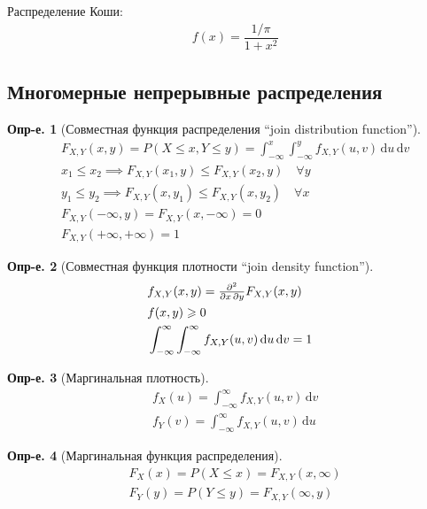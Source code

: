 \documentclass[a4paper,12pt,fleqn]{article}
\numberwithin{figure}{section}
\theoremstyle{definition}
\newtheorem{definition}{Опр-е.}[section]
\let\leqs\leqslant
\let\geqs\geqslant
\def\d{\mathrm{d}}
\begin{document}
Распределение Коши:
\begin{align*}
&	f(x)=\dfrac{1/\pi}{1+x^2}
\end{align*}


\subsection{Многомерные непрерывные распределения}


\begin{definition}[Совместная функция распределения ``join distribution function'']
\begin{align*}
&	F_{X,Y}(x,y) = P(X\leqs x, Y\leqs y)
	= \int_{-\infty}^x \int_{-\infty}^y f_{X,Y}(u,v) \, \d u \, \d v	\\
&	x_1 \leqs x_2 \implies F_{X,Y}(x_1,y) \leqs F_{X,Y}(x_2,y)	\quad \forall y	\\
&	y_1 \leqs y_2 \implies F_{X,Y}(x,y_1) \leqs F_{X,Y}(x,y_2)	\quad \forall x	\\
&	F_{X,Y}(-\infty,y) = F_{X,Y}(x,-\infty) = 0	\\
&	F_{X,Y}(+\infty,+\infty) = 1
\end{align*}
\end{definition}

\begin{definition}[Совместная функция плотности ``join density function'']
\begin{align*}
&	f_{X,Y}(x,y) = \mathsmaller{\frac{\partial^2}{\partial x\,\partial y}} F_{X,Y}(x,y)	\\
&	f(x,y) \geqs 0		\\
&	\int_{-\infty}^{\infty} \int_{-\infty}^{\infty} f_{X,Y}(u,v) \, \d u \, \d v = 1
\end{align*}
\end{definition}

\begin{definition}[Маргинальная плотность]
\begin{align*}
&	f_X(u) = \int_{-\infty}^{\infty} f_{X,Y}(u,v) \, \d v	\\
&	f_Y(v) = \int_{-\infty}^{\infty} f_{X,Y}(u,v) \, \d u
\end{align*}
\end{definition}

\begin{definition}[Маргинальная функция распределения]
\begin{align*}
&	F_X(x) = P(X \leqs x) = F_{X,Y}(x,\infty)	\\
&	F_Y(y) = P(Y \leqs y) = F_{X,Y}(\infty,y)
\end{align*}
\end{definition}
\end{document}
